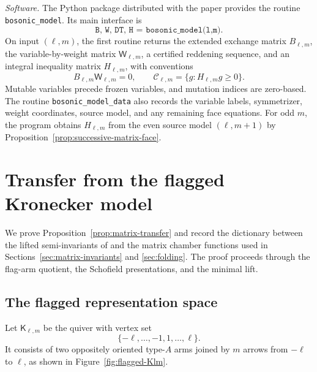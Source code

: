 \documentclass[11pt]{amsart}
\theoremstyle{definition}
\theoremstyle{remark}
\begin{document}
\medskip
\noindent\emph{Software.}
The Python package distributed with the paper provides the routine
\texttt{bosonic\_model}.  Its main interface is
\[ \texttt{B, W, DT, H = bosonic\_model(l,m)}. \]
On input $(\ell,m)$, the first routine returns the extended exchange matrix $B_{\ell,m}$, the
variable-by-weight matrix $\mathsf W_{\ell,m}$, a certified reddening
sequence, and an integral inequality matrix $H_{\ell,m}$, with conventions
\[ B_{\ell,m}\mathsf W_{\ell,m}=0,\qquad \mathscr C_{\ell,m}=\{g:H_{\ell,m}g\geq0\}. \]
Mutable variables precede frozen variables, and mutation indices are
zero-based.  The routine \texttt{bosonic\_model\_data} also records the
variable labels, symmetrizer, weight coordinates, source model, and any
remaining face equations.  For odd $m$, the program obtains
$H_{\ell,m}$ from the even source model $(\ell,m+1)$ by Proposition~\ref{prop:successive-matrix-face}.  

\appendix

\section{Transfer from the flagged Kronecker model}
\label{app:matrix-transfer}

We prove Proposition~\ref{prop:matrix-transfer} and record the dictionary
between the lifted semi-invariants of \cite{FeiKroneckerII} and the matrix
chamber functions used
in Sections~\ref{sec:matrix-invariants} and \ref{sec:folding}.  The proof
proceeds through the flag-arm quotient, the Schofield presentations, and the
minimal lift.

\subsection{The flagged representation space}

Let $\mathsf K_{\ell,m}$ be the quiver with vertex set
\[ \{-\ell,\ldots,-1,1,\ldots,\ell\}. \]
It consists of two oppositely oriented type-$A$ arms joined by $m$ arrows
from $-\ell$ to $\ell$, as shown in Figure~\ref{fig:flagged-Klm}.
\end{document}
